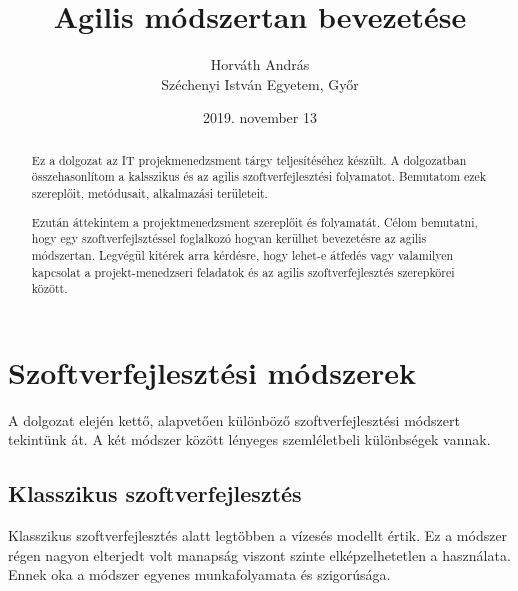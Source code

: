 \documentclass[a4paper,12pt,leqno, notitlepage]{article}%
\begin{document}
\title{Agilis módszertan bevezetése}
\author{Horváth András \\ Széchenyi István Egyetem, Győr}
\date{2019. november 13}
\maketitle

\begin{abstract}

Ez a dolgozat az IT projekmenedzsment tárgy teljesítéséhez készült. A dolgozatban összehasonlítom a kalsszikus és az agilis szoftver\-fejlesztési folya\-matot. Bemutatom ezek szereplőit, metódusait, alkalmazási területeit.

Ezután áttekintem a projektmenedzsment szereplőit és folyamatát. Célom bemutatni, hogy egy szoftverfejlsztéssel foglalkozó hogyan kerülhet bevezetésre az agilis módszertan. Legvégül kitérek arra kérdésre, hogy lehet-e átfedés vagy valamilyen kapcsolat a projekt-menedzseri feladatok és az agilis szoftver\-fejlesztés szerepkörei között.
\end{abstract}

\section{Szoftver\-fejlesztési módszerek}
\label{sec:s}

A dolgozat elején kettő, alapvetően különböző szoftver\-fejlesztési módszert tekintünk át. A két módszer között lényeges szemléletbeli különbségek vannak.

\subsection{Klasszikus szoftver\-fejlesztés}
\label{sec:Klasszikus}

Klasszikus szoftver\-fejlesztés alatt legtöbben a vízesés modellt értik. Ez a módszer régen nagyon elterjedt volt manapság viszont szinte elképzelhetetlen a használata. Ennek oka a módszer egyenes munkafolyamata és szigorúsága.
\end{document}
